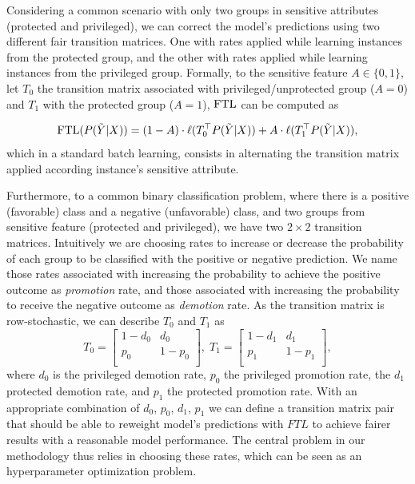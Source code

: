 Considering a common scenario with only two groups in sensitive attributes (protected and privileged), we can correct the model's predictions using two different fair transition matrices. One with rates applied while learning instances from the protected group, and the other with rates applied while learning instances from the privileged group. Formally, to the sensitive feature $A \in \{0,1\}$, let $T_0$ the transition matrix associated with privileged/unprotected group ($A = 0$) and $T_1$ with the protected group ($A = 1$), $\operatorname{FTL}$ can be computed as

\begin{equation}
    \operatorname{FTL}(P(\tilde{Y}|X)) = (1-A) \cdot \ell(T^{\top}_0 P(\tilde{Y}|X)) + A \cdot \ell(T^{\top}_1 P(\tilde{Y}|X)),
\end{equation}
which in a standard batch learning, consists in alternating the transition matrix applied according instance's sensitive attribute.

Furthermore, to a common binary classification problem, where there is a positive (favorable) class and a negative (unfavorable) class, and two groups from sensitive feature (protected and privileged), we have two $2\times2$ transition matrices. Intuitively we are choosing rates to increase or decrease the probability of each group to be classified with the positive or negative prediction. We name those rates associated with increasing the probability to achieve the positive outcome as \textit{promotion} rate, and those associated with increasing the probability to receive the negative outcome as \textit{demotion} rate. As the transition matrix is row-stochastic, we can describe $T_0$ and $T_1$ as
\begin{equation} \label{eq:transition_matrices}
    T_0 = \left[\begin{array}{cc}
        1-d_0 & d_0\\
        p_0 & 1-p_0\\
    \end{array}\right],\;
    T_1 = \left[\begin{array}{cc}
        1-d_1 & d_1\\
        p_1 & 1-p_1\\
    \end{array}\right],
\end{equation}
where $d_0$ is the privileged demotion rate, $p_0$ the privileged promotion rate, the $d_1$ protected demotion rate, and $p_1$ the protected promotion rate. With an appropriate combination of $d_0$, $p_0$, $d_1$, $p_1$ we can define a transition matrix pair that should be able to reweight model's predictions with $FTL$ to achieve fairer results with a reasonable model performance. The central problem in our methodology thus relies in choosing these rates, which can be seen as an hyperparameter optimization problem.

